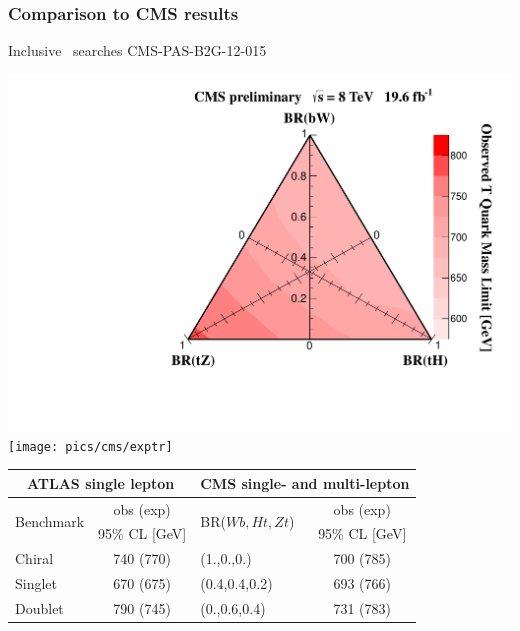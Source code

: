 \begin{frame}\frametitle{Comparison to CMS results}
\centering\footnotesize

Inclusive \TTbar\ searches {\cccolor CMS-PAS-B2G-12-015~\cite{CMS-PAS-B2G-12-015}}
\myskip

\includegraphics[width=.34\textwidth]{pics/cms/triangle}
\texttt{[image: pics/cms/exptr]}

\begin{tabular}{lclc}\toprule
\multicolumn{2}{c}{ATLAS single lepton} & \multicolumn{2}{c}{CMS single- and multi-lepton}\\\midrule
\multirow{2}{*}{Benchmark} & obs (exp) & \multirow{2}{*}{BR($Wb,Ht,Zt$)}  & obs (exp) \\
          & 95\% CL [GeV] & & 95\% CL [GeV] \\
Chiral & 740 (770) & (1.,0.,0.) & 700 (785)\\
Singlet & 670 (675) & (0.4,0.4,0.2) & 693 (766)\\
Doublet & 790 (745) & (0.,0.6,0.4) & 731 (783) \\
\bottomrule\end{tabular}


\end{frame}


